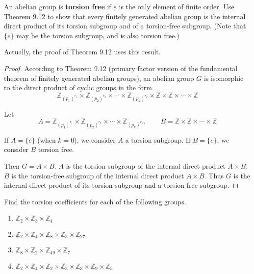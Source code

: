 \begin{exercise}
    An abelian group is \textbf{torsion free} if $e$ is the only element of finite order. Use Theorem 9.12 to show that every finitely generated abelian group is the internal direct product of its torsion subgroup and of a torsion-free subgroup. (Note that $\{e\}$ may be the torsion subgroup, and is also torsion free.)
\end{exercise}

Actually, the proof of Theorem 9.12 uses this result.

\begin{proof}
    According to Theorem 9.12 (primary factor version of the fundamental theorem of finitely generated abelian groups), an abelian group $G$ is isomorphic to the direct product of cyclic groups in the form
    \[
        \mathbb{Z}_{{(p_{1})}^{r_{1}}} \times \mathbb{Z}_{{(p_{2})}^{r_{2}}} \times \cdots \times \mathbb{Z}_{{(p_{k})}^{r_{k}}} \times \mathbb{Z} \times \mathbb{Z} \times \cdots \times \mathbb{Z}
    \]

    Let
    \[
        A = \mathbb{Z}_{{(p_{1})}^{r_{1}}} \times \mathbb{Z}_{{(p_{2})}^{r_{2}}} \times \cdots \times \mathbb{Z}_{{(p_{k})}^{r_{k}}},\qquad B = \mathbb{Z} \times \mathbb{Z} \times \cdots \times \mathbb{Z}
    \]

    If $A = \{e\}$ (when $k = 0$), we consider $A$ a torsion subgroup. If $B = \{e\}$, we consider $B$ torsion free.

    Then $G = A\times B$. $A$ is the torsion subgroup of the internal direct product $A\times B$, $B$ is the torsion-free subgroup of the internal direct product $A\times B$. Thus $G$ is the internal direct product of its torsion subgroup and a torsion-free subgroup.
\end{proof}

\begin{exercise}
    Find the torsion coefficients for each of the following groups.
    \begin{enumerate}[label={\textbf{\alph*.}}]
        \item $\mathbb{Z}_{2} \times \mathbb{Z}_{3} \times \mathbb{Z}_{4}$
        \item $\mathbb{Z}_{2} \times \mathbb{Z}_{4} \times \mathbb{Z}_{8} \times \mathbb{Z}_{3} \times \mathbb{Z}_{27}$
        \item $\mathbb{Z}_{8} \times \mathbb{Z}_{2} \times \mathbb{Z}_{49} \times \mathbb{Z}_{7}$
        \item $\mathbb{Z}_{2} \times \mathbb{Z}_{4} \times \mathbb{Z}_{2} \times \mathbb{Z}_{3} \times \mathbb{Z}_{3} \times \mathbb{Z}_{9} \times \mathbb{Z}_{5}$
    \end{enumerate}
\end{exercise}

